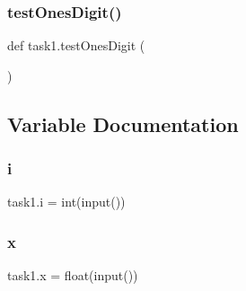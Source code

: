 \subsubsection{\texorpdfstring{test\+Ones\+Digit()}{testOnesDigit()}}
{\footnotesize\ttfamily def task1.\+test\+Ones\+Digit (\begin{DoxyParamCaption}{ }\end{DoxyParamCaption})}



\subsection{Variable Documentation}
\mbox{\label{namespacetask1_aec1d455ab1e1e756d790401a19122156}} 
\subsubsection{\texorpdfstring{i}{i}}
{\footnotesize\ttfamily task1.\+i = int(input())}

\mbox{\label{namespacetask1_a0d71885f905bd0d3a37229562c0cb4c7}} 
\subsubsection{\texorpdfstring{x}{x}}
{\footnotesize\ttfamily task1.\+x = float(input())}

